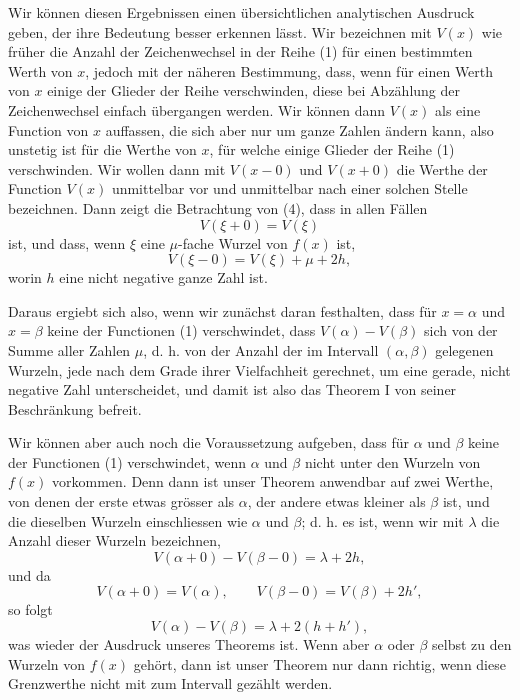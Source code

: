 \documentclass[11pt]{article}
\begin{document}
Wir können diesen Ergebnissen einen übersichtlichen analytischen Ausdruck geben, der ihre Bedeutung besser erkennen lässt. Wir bezeichnen mit $V(x)$ wie früher die Anzahl der Zeichenwechsel in der Reihe (1) für einen bestimmten Werth von $x$, jedoch mit der näheren Bestimmung, dass, wenn für einen Werth von $x$ einige der Glieder der Reihe verschwinden, diese bei Abzählung der Zeichenwechsel einfach übergangen werden. Wir können dann $V(x)$ als eine Function von $x$ auffassen, die sich aber nur um ganze Zahlen ändern kann, also unstetig ist für die Werthe von $x$, für welche einige Glieder der Reihe (1) verschwinden. Wir wollen dann mit $V(x-0)$ und $V(x+0)$ die Werthe der Function $V(x)$ unmittelbar vor und unmittelbar nach einer solchen Stelle bezeichnen. Dann zeigt die Betrachtung von (4), dass in allen Fällen
\begin{equation}
        V(\xi+0)=V(\xi)
\tag{6}
\end{equation}
ist, und dass, wenn $\xi$ eine $\mu$-fache Wurzel von $f(x)$ ist,
\begin{equation}
        V(\xi-0)=V(\xi)+\mu+2h,
\tag{7}
\end{equation}
worin $h$ eine nicht negative ganze Zahl ist.

Daraus ergiebt sich also, wenn wir zunächst daran festhalten, dass für $x=\alpha$ und $x=\beta$ keine der Functionen (1) verschwindet, dass $V(\alpha)-V(\beta)$ sich von der Summe aller Zahlen $\mu$, d. h. von der Anzahl der im Intervall $(\alpha,\beta)$ gelegenen Wurzeln, jede nach dem Grade ihrer Vielfachheit gerechnet, um eine gerade, nicht negative Zahl unterscheidet, und damit ist also das Theorem I von seiner Beschränkung befreit.

Wir können aber auch noch die Voraussetzung aufgeben, dass für $\alpha$ und $\beta$ keine der Functionen (1) verschwindet, wenn $\alpha$ und $\beta$ nicht unter den Wurzeln von $f(x)$ vorkommen. Denn dann ist unser Theorem anwendbar auf zwei Werthe, von denen der erste etwas grösser als $\alpha$, der andere etwas kleiner als $\beta$ ist, und die dieselben Wurzeln einschliessen wie $\alpha$ und $\beta$; d. h. es ist, wenn wir mit $\lambda$ die Anzahl dieser Wurzeln bezeichnen,
\[
        V(\alpha+0)-V(\beta-0)=\lambda+2h,
\]
und da
\[
        V(\alpha+0)=V(\alpha),\qquad
        V(\beta-0)=V(\beta)+2h',
\]
so folgt
\[
        V(\alpha)-V(\beta)=\lambda+2(h+h'),
\]
was wieder der Ausdruck unseres Theorems ist. Wenn aber $\alpha$ oder $\beta$ selbst zu den Wurzeln von $f(x)$ gehört, dann ist unser Theorem nur dann richtig, wenn diese Grenzwerthe nicht mit zum Intervall gezählt werden.
\end{document}
